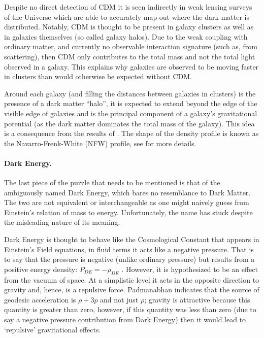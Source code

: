 Despite no direct detection of CDM it is seen indirectly in weak lensing surveys of the Universe which are able to accurately map out where the dark matter is distributed. Notably, CDM is thought to be present in galaxy clusters as well as in galaxies themselves (so called galaxy halos). Due to the weak coupling with ordinary matter, and currently no observable interaction signature (such as, from scattering), then CDM only contributes to the total mass and not the total light observed in a galaxy. This explains why galaxies are observed to be moving faster in clusters than would otherwise be expected without CDM. \citep{bib_pea, bib_nfw}

Around each galaxy (and filling the distances between galaxies in clusters) is the presence of a dark matter ``halo'', it is expected to extend beyond the edge of the visible edge of galaxies and is the principal component of a galaxy's gravitational potential (as the dark matter dominates the total mass of the galaxy). This idea is a consequence from the results of \citet{bib_rub}. The shape of the density profile is known as the Navarro-Frenk-White (NFW) profile, see \citet{bib_nfw} for more details.

\paragraph{Dark Energy.} The last piece of the puzzle that needs to be mentioned is that of the ambiguously named Dark Energy, which bares no resemblance to Dark Matter. The two are not equivalent or interchangeable as one might naively guess from Einstein's relation of mass to energy. Unfortunately, the name has stuck despite the misleading nature of its meaning.

Dark Energy is thought to behave like the Cosmological Constant \citep{bib_lah} that appears in Einstein's Field equations, in fluid terms it acts like a negative pressure. That is to say that the pressure is negative (unlike ordinary pressure) but results from a positive energy density: $P_{DE} = - \rho_{DE}$ \citep{bib_pad}. However, it is hypothesized to be an effect from the vacuum of space. At a simplistic level it acts in the opposite direction to gravity and, hence, is a repulsive force. Padmanabhan indicates that the source of geodesic acceleration is $\rho +3p$ and not just $\rho$; gravity is attractive because this quantity is greater than zero, however, if this quantity was less than zero (due to say a negative pressure contribution from Dark Energy) then it would lead to `repulsive' gravitational effects.

